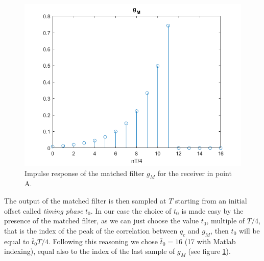 \documentclass[a4paper,11.5pt]{article}
\begin{document}
\begin{figure}[ht]
	\begin{center}   
		\includegraphics[width=\textwidth]{figs/A_gm.png} 
		\caption{Impulse response of the matched filter $g_{M}$ for the receiver in point A.}
		\label{fig:A_gm}
	\end{center}
\end{figure} 

The output of the matched filter is then sampled at $T$ starting from an initial offset called \emph{timing phase} $t_0$. In our case the choice of $t_0$ is made easy by the presence of the matched filter, as we can just choose the value $\bar{t}_0$, multiple of $T/4$, that is the index of the peak of the correlation between $q_c$ and $g_M$, then $t_0$ will be equal to $\bar{t}_0 T/4$. Following this reasoning we chose $\bar{t}_0=16$ (17 with Matlab indexing), equal also to the index of the last sample of $g_M$ (see figure \ref{fig:A_gm}).
\end{document}
